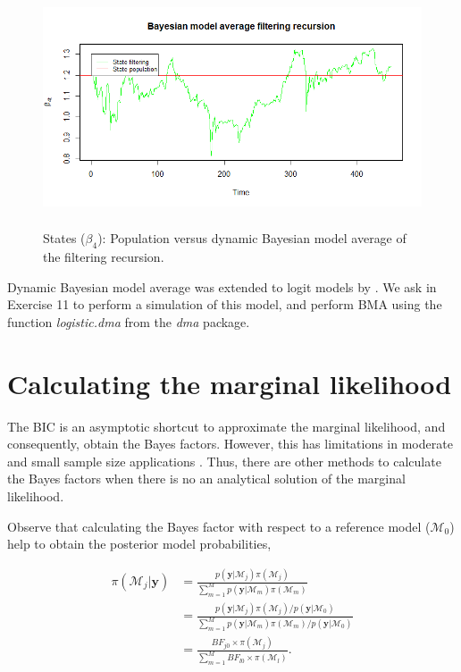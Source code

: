 \begin{figure}[!h]
	\includegraphics[width=340pt, height=200pt]{Chapters/chapter8/figures/figPMPdbma4.png}
	\caption[List of figure caption goes here]{States ($\beta_{4}$): Population versus dynamic Bayesian model average of the filtering recursion.}\label{figPMPdbma4}
\end{figure}

Dynamic Bayesian model average was extended to logit models by \cite{mccormick2012dynamic}. We ask in Exercise 11 to perform a simulation of this model, and perform BMA using the function \textit{logistic.dma} from the \textit{dma} package.

\section{Calculating the marginal likelihood}\label{sec10_4}

The BIC is an asymptotic shortcut to approximate the marginal likelihood, and consequently, obtain the Bayes factors. However, this has limitations in moderate and small sample size applications \cite{gelfand1994bayesian}. Thus, there are other methods to calculate the Bayes factors when there is no an analytical solution of the marginal likelihood.

Observe that calculating the Bayes factor with respect to a reference model ($\mathcal{M}_0$) help to obtain the posterior model probabilities,

\begin{align*}
	\pi(\mathcal{M}_j |\bm{y})&=\frac{p(\bm{y} | \mathcal{M}_j)\pi(\mathcal{M}_j)}{\sum_{m=1}^{M}p(\bm{y} | \mathcal{M}_m)\pi(\mathcal{M}_m)}\\
	&=\frac{p(\bm{y} | \mathcal{M}_j)\pi(\mathcal{M}_j)/p(\bm{y} | \mathcal{M}_0)}{\sum_{m=1}^{M}p(\bm{y} | \mathcal{M}_m)\pi(\mathcal{M}_m)/p(\bm{y} | \mathcal{M}_0)}\\
	&=\frac{BF_{j0}\times\pi(\mathcal{M}_j)}{\sum_{m=1}^{M}BF_{l0}\times\pi(\mathcal{M}_l)}.
\end{align*}

